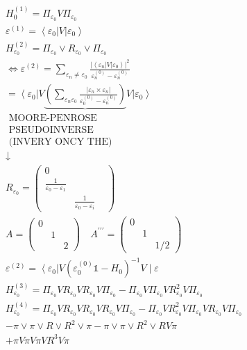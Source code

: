 \documentclass[10pt]{article}
\begin{document}
$$
\begin{aligned}
& H_{0}^{(1)}=\Pi_{\varepsilon_{0}} V \Pi_{\varepsilon_{0}} \\
& \varepsilon^{(1)}=\left\langle\varepsilon_{0}\right| V\left|\varepsilon_{0}\right\rangle \\
& H_{\varepsilon_{0}}^{(2)}=\Pi_{\varepsilon_{0}} \vee R_{\varepsilon_{0}} \vee \Pi_{\varepsilon_{0}} \\
& \Leftrightarrow \varepsilon^{(2)}=\sum_{\varepsilon_{n} \neq \varepsilon_{0}} \frac{\left.\left|\left\langle\varepsilon_{n}\right| V\right| \varepsilon_{0}\right\rangle\left.\right|^{2}}{\varepsilon_{n}^{(0)}-\varepsilon_{n}^{(0)}} \\
& =\left\langle\varepsilon_{0}\right| V \underbrace{\left(\sum_{\varepsilon_{n} \varepsilon_{0}} \frac{\left|\varepsilon_{n} \times \varepsilon_{n}\right|}{\varepsilon_{0}^{(0)}-\varepsilon_{n}^{(0)}}\right)} V\left|\varepsilon_{0}\right\rangle \\
& \text { MOORE-PENROSE } \\
& \text { PSEUDOINVERSE } \\
& \text { (INVERY ONCY THE) } \\
& \downarrow \\
& R_{\varepsilon_{0}}=\left(\begin{array}{ccl}
0 & & \\
\frac{1}{\varepsilon_{0}-\varepsilon_{1}} & \\
& \frac{1}{\varepsilon_{0}-\varepsilon_{i}}
\end{array}\right) \\
& A=\left(\begin{array}{lll}
0 & & \\
& 1 & \\
& & 2
\end{array}\right) \quad A^{\prime \prime \prime}=\left(\begin{array}{lll}
0 & & \\
& 1 & \\
& & 1 / 2
\end{array}\right) \\
& \varepsilon^{(2)}=\left\langle\varepsilon_{0}\right| V\left(\varepsilon_{0}^{(0)} \mathbb{1}-H_{0}\right)^{-1} V \mid \varepsilon \\
& H_{\varepsilon_{0}}^{(3)}=\Pi_{\varepsilon_{0}} V R_{\varepsilon_{0}} V R_{\varepsilon_{0}} V \Pi_{\varepsilon_{0}}-\Pi_{\varepsilon_{0}} V \Pi_{\varepsilon_{0}} V R_{\varepsilon_{0}}^{2} V \Pi_{\varepsilon_{0}} \\
& H_{\varepsilon_{0}}^{(4)}=\Pi_{\varepsilon_{0}} V R_{\varepsilon_{0}} V R_{\varepsilon_{0}} V R_{\varepsilon_{0}} V \Pi_{\varepsilon_{0}}-\Pi_{\varepsilon_{0}} V R_{\varepsilon_{0}}^{2} V \Pi_{\varepsilon_{0}} V R_{\varepsilon_{0}} V \Pi_{\varepsilon_{0}} \\
& -\pi \vee \pi \vee R \vee R^{2} \vee \pi-\pi \vee \pi \vee R^{2} \vee R V \pi \\
& +\pi V \pi V \pi V R^{3} V \pi
\end{aligned}
$$
\end{document}
